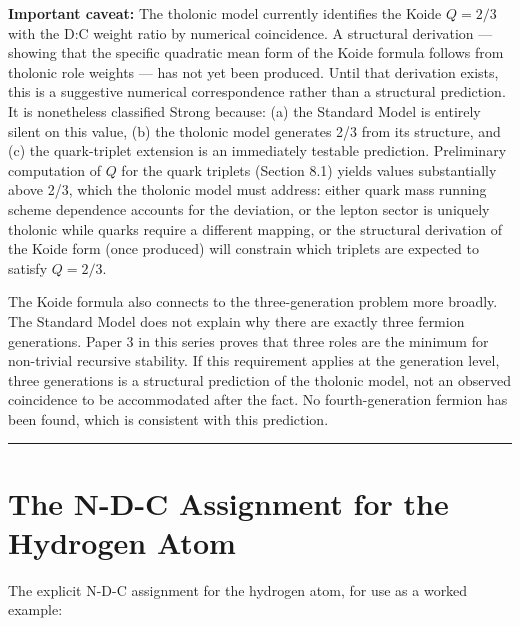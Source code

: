 \documentclass[12pt]{article}
\begin{document}
\textbf{Important caveat:} The tholonic model currently identifies the
Koide \(Q = 2/3\) with the D:C weight ratio by numerical coincidence. A
structural derivation --- showing that the specific quadratic mean form
of the Koide formula follows from tholonic role weights --- has not yet
been produced. Until that derivation exists, this is a suggestive
numerical correspondence rather than a structural prediction. It is
nonetheless classified Strong because: (a) the Standard Model is
entirely silent on this value, (b) the tholonic model generates 2/3 from
its structure, and (c) the quark-triplet extension is an immediately
testable prediction. Preliminary computation of \(Q\) for the quark
triplets (Section 8.1) yields values substantially above 2/3, which the
tholonic model must address: either quark mass running scheme dependence
accounts for the deviation, or the lepton sector is uniquely tholonic
while quarks require a different mapping, or the structural derivation
of the Koide form (once produced) will constrain which triplets are
expected to satisfy \(Q = 2/3\).

The Koide formula also connects to the three-generation problem more
broadly. The Standard Model does not explain why there are exactly three
fermion generations. Paper 3 in this series proves that three roles are
the minimum for non-trivial recursive stability. If this requirement
applies at the generation level, three generations is a structural
prediction of the tholonic model, not an observed coincidence to be
accommodated after the fact. No fourth-generation fermion has been
found, which is consistent with this prediction.

\begin{center}\rule{0.5\linewidth}{0.5pt}\end{center}

\section{The N-D-C Assignment for the Hydrogen Atom}\label{the-n-d-c-assignment-for-the-hydrogen-atom}

The explicit N-D-C assignment for the hydrogen atom, for use as a worked
example:
\end{document}
